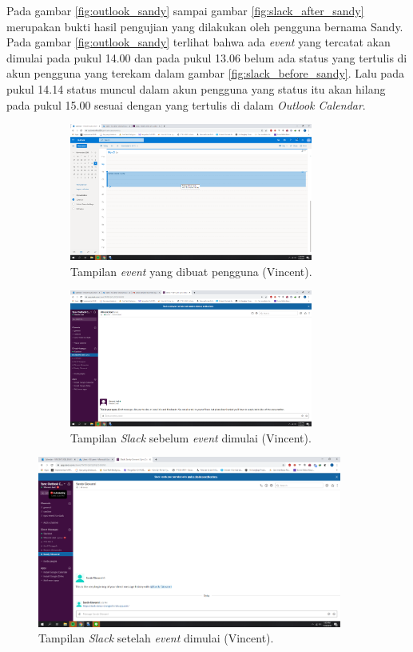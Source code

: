 Pada gambar \ref{fig:outlook_sandy} sampai gambar \ref{fig:slack_after_sandy} merupakan bukti hasil pengujian yang dilakukan oleh pengguna bernama Sandy. Pada gambar \ref{fig:outlook_sandy} terlihat bahwa ada \textit{event} yang tercatat akan dimulai pada pukul 14.00 dan pada pukul 13.06 belum ada status yang tertulis di akun pengguna yang terekam dalam gambar \ref{fig:slack_before_sandy}. Lalu pada pukul 14.14 status muncul dalam akun pengguna yang status itu akan hilang pada pukul 15.00 sesuai dengan yang tertulis di dalam \textit{Outlook Calendar}.

\begin{figure}[h]
\begin{subfigure}{8.5cm}
  \centering
  \includegraphics[width=8cm]{./Gambar/PengujianVincent/Outlook.png}
  \caption{Tampilan \textit{event} yang dibuat pengguna (Vincent).}
  \label{fig:outlook_vincent}
\end{subfigure}
\begin{subfigure}{8.5cm}
  \centering
  \includegraphics[width=8cm]{./Gambar/PengujianVincent/Slack_Before.png}
  \caption{Tampilan \textit{Slack} sebelum \textit{event} dimulai (Vincent).}
  \label{fig:slack_before_vincent}
\end{subfigure}
\caption{}
\end{figure}

\begin{figure}[h]
  \includegraphics[width=10cm]{./Gambar/PengujianVincent/Slack_After.png}
  \centering
  \caption{Tampilan \textit{Slack} setelah \textit{event} dimulai (Vincent).}
  \label{fig:slack_after_vincent}
\end{figure}

